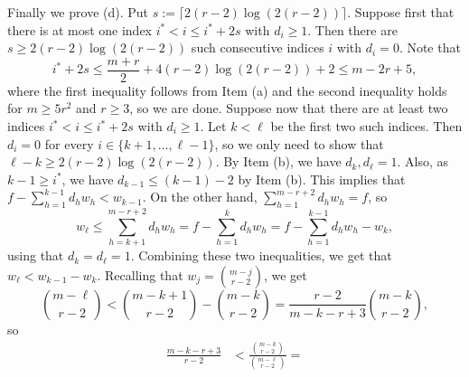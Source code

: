 \documentclass[11pt]{article}
\let\oldendproof\endproof
\renewenvironment{proof}[1][\proofname]{%
	\oldproof[\bf #1]%
}{\oldendproof}
\theoremstyle{plain}
\begin{document}
\begin{proof}[Proof of Lemma \ref{r-graphs induction base case}]
\begin{proof}
        Finally we prove (d). 
        Put $s := \lceil 2(r-2) \log(2(r-2)) \rceil$.
        Suppose first that there is at most one index $i^* < i \leq i^* + 2s$ with $d_i \geq 1$. 
        Then there are $s \geq 2(r-2) \log(2(r-2))$ such consecutive indices $i$ with $d_i = 0$. Note that 
        $$
        i^* + 2s \leq \frac{m+r}{2} + 4(r-2) \log(2(r-2)) + 2 \leq m-2r+5,
        $$
        where the first inequality follows from Item (a) and the second inequality holds for $m \geq 5r^2$ and $r \geq 3$, so we are done. 
        Suppose now that there are at least two indices $i^* < i \leq i^* + 2s$ with $d_i \geq 1$. Let $k < \ell$ be the first two such indices. Then $d_i = 0$ for every $i \in \{k+1,\dots,\ell-1\}$, so we only need to show that $\ell-k \geq 2(r-2) \log(2(r-2))$.
        By Item (b), we have $d_k,d_{\ell} = 1$. Also, as $k-1 \geq i^*$, we have $d_{k-1} \leq (k-1) - 2$ by Item (b). This implies that $f-\sum_{h=1}^{k-1} d_h w_h < w_{k-1}$. On the other hand, 
        $\sum_{h=1}^{m-r+2} d_h w_h = f$, so 
        $$
        w_{\ell} \leq \sum_{h=k+1}^{m-r+2} d_h w_h = 
        f-\sum_{h=1}^{k} d_h w_h = f - \sum_{h=1}^{k-1} d_h w_h - w_k,
        $$
        using that $d_k = d_{\ell} = 1$. Combining these two inequalities, we get that $w_{\ell} < w_{k-1} - w_k$. Recalling that $w_j = \binom{m-j}{r-2}$, we get
        $$
        \binom{m-\ell}{r-2} < \binom{m-k+1}{r-2} - \binom{m-k}{r-2} = 
        \frac{r-2}{m-k-r+3} \binom{m-k}{r-2},
        $$
        so 
        \begin{align*}
        \frac{m-k-r+3}{r-2} &< \frac{\binom{m-k}{r-2}}{\binom{m-\ell}{r-2}} =

\end{align*}
\end{proof}
\end{proof}
\end{document}
